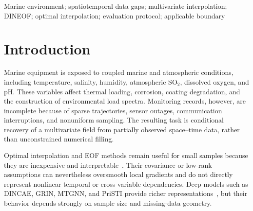 \documentclass[conference]{IEEEtran}
\begin{document}
\begin{abstract}
Marine monitoring records are often sparse in space and time and may be asynchronously missing across variables. We propose a small-sample multivariate reconstruction framework that uses a same-time local Gaussian prior and learns residual corrections from temporal states, spatial context, and cross-variable relations. The method is evaluated on nine marine regions with seven environmental variables using chronological train/validation/test splits and shared masks across all methods. At 70\% random missingness, the proposed model is competitive with local interpolation, EOF-style reconstruction, and a joint convolutional recurrent baseline, while the best method changes with the variable and missing-data geometry. Ablation results identify the local prior as the most consistent information source and show that temporal and cross-variable branches provide variable-dependent corrections. The study therefore treats reconstruction as a conditional field-recovery problem and reports the operating conditions under which each information source is useful.
\end{abstract}

\begin{IEEEkeywords}
Marine environment; spatiotemporal data gaps; multivariate interpolation; DINEOF; optimal interpolation; evaluation protocol; applicable boundary
\end{IEEEkeywords}

\section{Introduction}
Marine equipment is exposed to coupled marine and atmospheric conditions, including temperature, salinity, humidity, atmospheric SO$_2$, dissolved oxygen, and pH. These variables affect thermal loading, corrosion, coating degradation, and the construction of environmental load spectra. Monitoring records, however, are incomplete because of sparse trajectories, sensor outages, communication interruptions, and nonuniform sampling. The resulting task is conditional recovery of a multivariate field from partially observed space--time data, rather than unconstrained numerical filling.

Optimal interpolation and EOF methods remain useful for small samples because they are inexpensive and interpretable~\cite{lorenc1986,beckers2003,alveraazcarate2005,beckers2006}. Their covariance or low-rank assumptions can nevertheless oversmooth local gradients and do not directly represent nonlinear temporal or cross-variable dependencies. Deep models such as DINCAE, GRIN, MTGNN, and PriSTI provide richer representations~\cite{barth2020dincae,cini2022grin,wu2020mtgnn,liu2023pristi}, but their behavior depends strongly on sample size and missing-data geometry.
\end{document}
